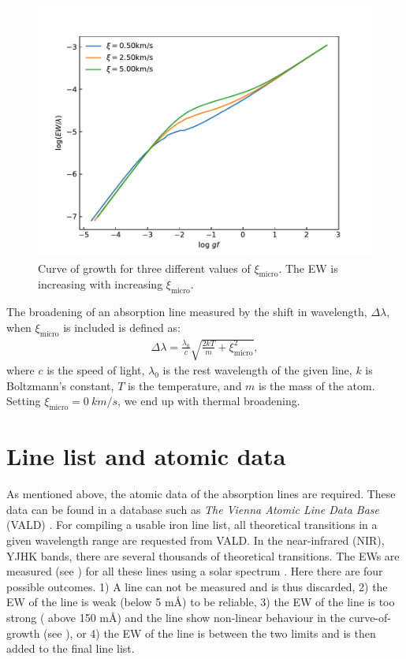 \begin{figure}[htpb!]
    \centering
    \includegraphics[width=1.0\linewidth]{figures/cog_vt.pdf}
    \caption{Curve of growth for three different values of $\xi_\mathrm{micro}$.
             The EW is increasing with increasing $\xi_\mathrm{micro}$.}
    \label{fig:cog_vt}
\end{figure}

The broadening of an absorption line measured by the shift in wavelength,
$\Delta\lambda$, when $\xi_\mathrm{micro}$ is included is defined as:
\begin{align}
  \Delta\lambda = \frac{\lambda_0}{c} \sqrt{\frac{2kT}{m} + \xi_\mathrm{micro}^2},
\end{align}
where $c$ is the speed of light, $\lambda_0$ is the rest wavelength of the given
line, $k$ is Boltzmann's constant, $T$ is the temperature, and $m$ is the mass
of the atom. Setting $\xi_\mathrm{micro}=\SI{0}{km/s}$, we end up with thermal
broadening.


\section{Line list and atomic data}
\label{sec:linelist}

As mentioned above, the atomic data of the absorption lines are required. These
data can be found in a database such as \emph{The Vienna Atomic Line Data Base}
(VALD) \citep{VALD1,VALD2}. For compiling a usable iron line list, all
theoretical transitions in a given wavelength range are requested from VALD. In
the near-infrared (NIR), YJHK bands, there are several thousands of theoretical
transitions. The EWs are measured (see ) for all these
lines using a solar spectrum \citep[][is used here]{Hinkle1995}. Here there are
four possible outcomes. 1) A line can not be measured and is thus discarded, 2)
the EW of the line is weak (below 5 m\AA{}) to be reliable, 3) the EW of the
line is too strong ( above 150 m\AA{}) and the line show non-linear behaviour in
the curve-of-growth (see ), or 4) the EW of the line is between
the two limits and is then added to the final line list.

